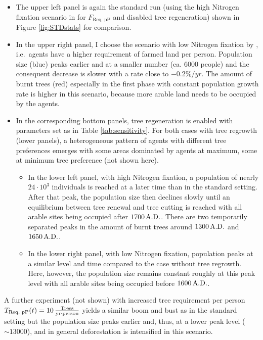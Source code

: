 \begin{itemize}
	\item The upper left panel is again the standard run (using the high Nitrogen fixation scenario in \citet{Puleston2017} for $F_\text{Req, pP}$ and disabled tree regeneration) shown in Figure \ref{fig:STDstats} for comparison.
	\item In the upper right panel, I choose the scenario with low Nitrogen fixation by \citet{Puleston2017}, i.e.\ agents have a higher requirement of farmed land per person.
	Population size (blue) peaks earlier and at a smaller number (ca. $6000$ people) and the consequent decrease is slower with a rate close to $-0.2\%/yr$.
	The amount of burnt trees (red) especially in the first phase with constant population growth rate is higher in this scenario, because more arable land needs to be occupied by the agents.
	\item In the corresponding bottom panels, tree regeneration is enabled with parameters set as in Table \ref{tab:sensitivity}. 
	For both cases with tree regrowth (lower panels), a heterogeneous pattern of agents with different tree preferences emerges with some areas dominated by agents at maximum, some at minimum tree preference (not shown here).
	\begin{itemize}
		\item In the lower left panel, with high Nitrogen fixation, a population of nearly $24\cdot10^3$ individuals is reached at a later time than in the standard setting. After that peak, the population size then declines slowly until an equilibrium between tree renewal and tree cutting is reached with all arable sites being occupied after $1700\, {\rm A.D.}$.
		There are two temporarily separated peaks in the amount of burnt trees around $1300\, {\rm A.D.}$ and $1650\, {\rm A.D.}$.
		\item In the lower right panel, with low Nitrogen fixation, population peaks at a similar level and time compared to the case without tree regrowth.
		Here, however, the population size remains constant roughly at this peak level with all arable sites being occupied before $1600\, {\rm A.D.}$.
	\end{itemize}

\end{itemize}
A further experiment (not shown) with increased tree requirement per person $T_\text{Req, pP}(t)=10\,{\rm \frac{Trees}{yr\cdot person}}$ yields a similar boom and bust as in the standard setting but the population size peaks earlier and, thus, at a lower peak level ($\sim 13000$), and in general deforestation is intensified in this scenario.
 
